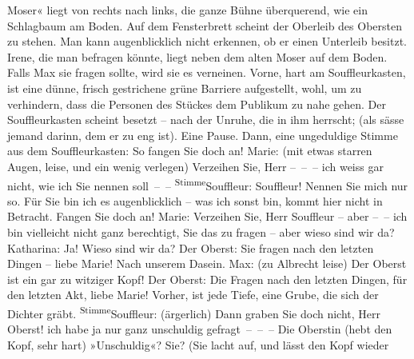					Moser« liegt von rechts nach links, die ganze Bühne überquerend, wie ein
					Schlagbaum am Boden. Auf dem Fensterbrett scheint der Oberleib des Obersten zu
					stehen. Man kann augenblicklich nicht erkennen, ob er einen Unterleib besitzt.
					Irene, die man befragen könnte, liegt neben dem alten Moser auf dem Boden. Falls
					Max sie fragen sollte, wird sie es verneinen.\pend
           \pstart
           Vorne, hart am Souffleurkasten, ist eine dünne, frisch gestrichene grüne Barriere
					aufgestellt, wohl, um zu verhindern, dass die Person\introOben{}en\introOben{}
					des Stückes dem Publikum zu nahe gehen. Der Souffleurkasten scheint besetzt –
					nach der Unruhe, die in ihm herrscht; (als sässe jemand darinn, dem
					er zu eng ist).\pend
           \pstart
           Eine Pause.\pend
           \pstart
           Dann, eine ungeduldige Stimme aus dem Souffleurkasten:\pend
           \pstart
           {\pb}So fangen Sie doch an!\pend
           \pstart
           Marie: (mit etwas starren Augen, leise, und ein wenig verlegen) Verzeihen Sie,
					Herr – – – ich weiss gar nicht, wie ich Sie nennen soll – –\pend
           \pstart
           \substVorne{}\textsuperscript{Stimme}{\allowbreak}\substDazwischen{}Souffleur\substHinten{}: Souffleur! Nennen Sie mich nur so. Für Sie bin ich es augenblicklich –
					was ich sonst bin, kommt hier nicht in Betracht. Fangen Sie doch an!\pend
           \pstart
           Marie: Verzeihen Sie, Herr Souffleur – aber – – ich bin vielleicht nicht
					ganz berechtigt, Sie das zu fragen – aber wieso sind wir da?\pend
           \pstart
           Katharina: Ja! Wieso sind wir da?\pend
           \pstart
           Der Oberst: Sie fragen nach den letzten Dingen – liebe Marie! Nach unserem
					Dasein.\pend
           \pstart
           Max: (zu Albrecht leise) Der Oberst ist ein gar zu witziger Kopf!\pend
           \pstart
           Der Oberst: Die  Fragen nach den letzten
					Dingen, für den letzten Akt, liebe Marie! Vorher, ist jede Tiefe, eine Grube,
					die sich der Dichter gräbt.\pend
           \pstart
           \substVorne{}\textsuperscript{Stimme}{\allowbreak}\substDazwischen{}Souffleur\substHinten{}: (ärgerlich) Dann graben Sie doch nicht, Herr Oberst!\pend
           \pstart
           \label{T_L01900-1v}\label{T_L01900-1h} ich
					habe ja nur ganz unschuldig gefragt – – –\pend
           \pstart
           Die Oberstin (hebt den Kopf, sehr hart) \introOben{}»\introOben{}Unschuldig\introOben{}«\introOben{}? Sie? (Sie lacht auf, und lässt den Kopf wieder
